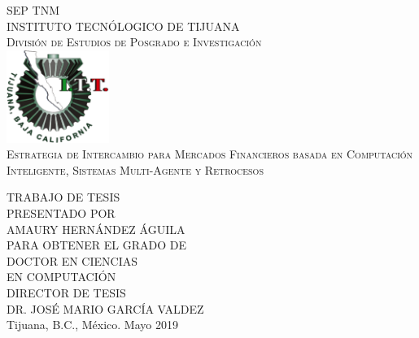 \begin{titlepage}
  \begin{center}
  \textsc{\Large SEP}
  \:\:\:\:\:\:\:\:\:\:\:\:\:\:\:\:\:\:\:\:\:\:\:\:\:\:\:\:\:\:\:\:\:\:\:\:
\:\:\:\:\:\:\:\:\:\:\:\:\:\:\:\:\:\:\:\:\:\:\:\:\:\:\:\:\:\:\:\:\:\:\:\:
\:\:\:\:\:\:\:\:\:\:\:\:\:\:\:\:
  \textsc{\Large TNM}~\\[1cm]
  \textsc{\Large INSTITUTO TECNÓLOGICO DE TIJUANA}~\\[1cm]
  \textsc{\Large División de Estudios de Posgrado e
    Investigación}~\\[0.5cm]

    \includegraphics[width=0.25\textwidth]{./logos.png}~\\[1cm]

    
    \textsc{\LARGE Estrategia de Intercambio para
Mercados Financieros basada en
Computación Inteligente, Sistemas
Multi-Agente y Retrocesos}~\\[1.5cm]




\begin{minipage}{1\textwidth}
  \begin{flushright} \large
    TRABAJO DE TESIS~\\[0.5cm]
    \small
    PRESENTADO POR~\\[0.5cm]
    \large
    AMAURY HERNÁNDEZ ÁGUILA~\\[0.5cm]
    \small
    PARA OBTENER EL GRADO DE~\\[0.5cm]
    \large
    DOCTOR EN CIENCIAS~\\
    EN COMPUTACIÓN~\\[0.5cm]
    \small
    DIRECTOR DE TESIS~\\
    \large
    DR. JOSÉ MARIO GARCÍA VALDEZ~\\[0.5cm]
    \small
    Tijuana, B.C., México. Mayo 2019
  \end{flushright}
\end{minipage}


\end{center}
\end{titlepage}
